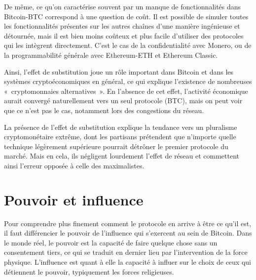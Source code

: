 De même, ce qu'on caractérise souvent par un manque de fonctionnalités dans Bitcoin-BTC correspond à une question de coût. Il est possible de simuler toutes les fonctionnalités présentes sur les autres chaînes d'une manière ingénieuse et détournée, mais il est bien moins coûteux et plus facile d'utiliser des protocoles qui les intègrent directement. C'est le cas de la confidentialité avec Monero, ou de la programmabilité générale avec Ethereum-ETH et Ethereum Classic.

Ainsi, l'effet de substitution joue un rôle important dans Bitcoin et dans les systèmes cryptoéconomiques en général, ce qui explique l'existence de nombreuses «~cryptomonnaies alternatives~». En l'absence de cet effet, l'activité économique aurait convergé naturellement vers un seul protocole (BTC), mais on peut voir que ce n'est pas le cas, notamment lors des congestions du réseau.


La présence de l'effet de substitution explique la tendance vers un pluralisme cryptomonétaire extrême, dont les partisans prétendent que n'importe quelle technique légèrement supérieure pourrait détrôner le premier protocole du marché. Mais en cela, ils négligent lourdement l'effet de réseau et commettent ainsi l'erreur opposée à celle des maximalistes.

\section*{Pouvoir et influence} %

Pour comprendre plus finement comment le protocole en arrive à être ce qu'il est, il faut différencier le pouvoir de l'influence qui s'exercent au sein de Bitcoin. Dans le monde réel, le pouvoir est la capacité de faire quelque chose sans un consentement tiers, ce qui se traduit en dernier lieu par l'intervention de la force physique. L'influence est quant à elle la capacité à influer sur le choix de ceux qui détiennent le pouvoir, typiquement les forces religieuses.

